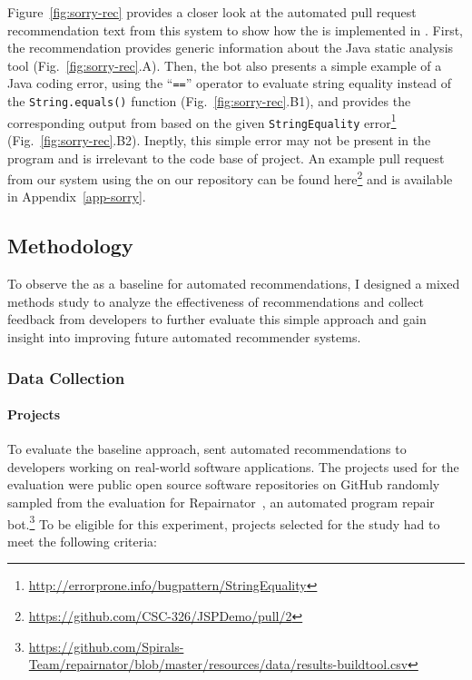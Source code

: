 Figure~\ref{fig:sorry-rec} provides a closer look at the automated pull request recommendation text from this system to show how the \tele is implemented in \toolone. First, the recommendation provides generic information about the \EP Java static analysis tool (Fig.~\ref{fig:sorry-rec}.A). Then, the bot also presents a simple example of a Java coding error, using the ``\texttt{==}'' operator to evaluate string equality instead of the \texttt{String.equals()} function (Fig.~\ref{fig:sorry-rec}.B1), and provides the corresponding output from \EP based on the given \texttt{StringEquality} error\footnote{\url{http://errorprone.info/bugpattern/StringEquality}} (Fig.~\ref{fig:sorry-rec}.B2). Ineptly, this simple error may not be present in the program and is irrelevant to the code base of project. An example pull request from our system using the \tele on our repository can be found here\footnote{\url{https://github.com/CSC-326/JSPDemo/pull/2}} and is available in Appendix~\ref{app-sorry}.





\subsection{Methodology}

To observe the \tele as a baseline for automated recommendations, I designed a mixed methods study to analyze the effectiveness of \toolone recommendations and collect feedback from developers to further evaluate this simple approach and gain insight into improving future automated recommender systems.

\subsubsection{Data Collection}

\paragraph*{Projects}

To evaluate the baseline \tele approach, \toolone sent automated recommendations to developers working on real-world software applications. The projects used for the evaluation were public open source software repositories on GitHub randomly sampled from the evaluation for Repairnator~\cite{Repairnator}, an automated program repair bot.\footnote{\url{https://github.com/Spirals-Team/repairnator/blob/master/resources/data/results-buildtool.csv}} To be eligible for this experiment, projects selected for the study had to meet the following criteria:

